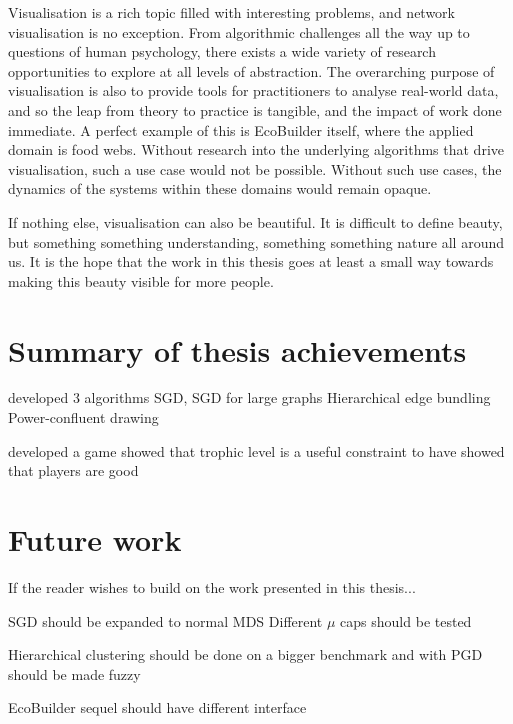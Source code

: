 Visualisation is a rich topic filled with interesting problems, and network visualisation is no exception. From algorithmic challenges all the way up to questions of human psychology, there exists a wide variety of research opportunities to explore at all levels of abstraction.
The overarching purpose of visualisation is also to provide tools for practitioners to analyse real-world data, and so the leap from theory to practice is tangible, and the impact of work done immediate.
A perfect example of this is EcoBuilder itself, where the applied domain is food webs. Without research into the underlying algorithms that drive visualisation, such a use case would not be possible. Without such use cases, the dynamics of the systems within these domains would remain opaque.

If nothing else, visualisation can also be beautiful.
It is difficult to define beauty, but something something understanding, something something nature all around us.
It is the hope that the work in this thesis goes at least a small way towards making this beauty visible for more people.

\section{Summary of thesis achievements}

developed 3 algorithms
SGD, SGD for large graphs
Hierarchical edge bundling
Power-confluent drawing

developed a game
showed that trophic level is a useful constraint to have 
showed that players are good

\section{Future work}
If the reader wishes to build on the work presented in this thesis...

SGD should be expanded to normal MDS
Different $\mu$ caps should be tested

Hierarchical clustering should be done on a bigger benchmark and with
PGD should be made fuzzy

EcoBuilder sequel should have different interface

